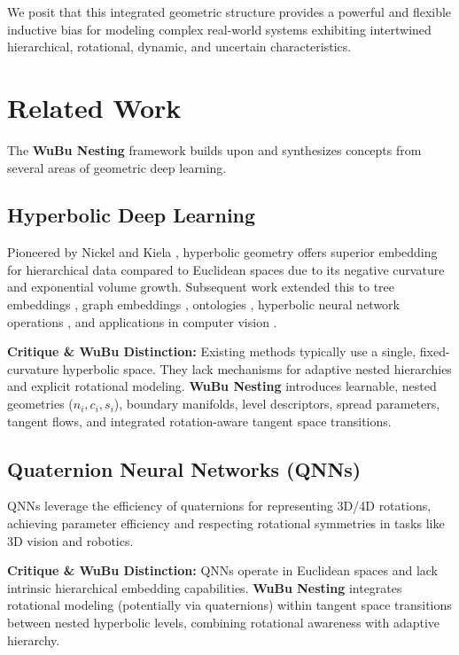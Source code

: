 \documentclass[11pt, twoside]{article} %
\newcommand{\wubu}{\textbf{WuBu Nesting}} %
\begin{document}
We posit that this integrated geometric structure provides a powerful and flexible inductive bias for modeling complex real-world systems exhibiting intertwined hierarchical, rotational, dynamic, and uncertain characteristics.

\section{Related Work}
\label{sec:related_work}

The \wubu{} framework builds upon and synthesizes concepts from several areas of geometric deep learning.

\subsection{Hyperbolic Deep Learning}
\label{subsec:hyperbolic_dl}

Pioneered by Nickel and Kiela \cite{NickelKiela2017}, hyperbolic geometry offers superior embedding for hierarchical data compared to Euclidean spaces due to its negative curvature and exponential volume growth. Subsequent work extended this to tree embeddings \cite{KhrulkovEtAl2020}, graph embeddings \cite{ErmolovEtAl2022, ChamiEtAl2019, ZhangEtAl2021}, ontologies \cite{AtighEtAl2022}, hyperbolic neural network operations \cite{GaneaEtAl2018, GulcehreEtAl2019}, and applications in computer vision \cite{KhrulkovEtAl2020, ErmolovEtAl2022, AtighEtAl2022, LiuHeHan2025}.

\textbf{Critique \& WuBu Distinction:} Existing methods typically use a single, fixed-curvature hyperbolic space. They lack mechanisms for adaptive nested hierarchies and explicit rotational modeling. \wubu{} introduces learnable, nested geometries ($n_i, c_i, s_i$), boundary manifolds, level descriptors, spread parameters, tangent flows, and integrated rotation-aware tangent space transitions.

\subsection{Quaternion Neural Networks (QNNs)}
\label{subsec:qnn}

QNNs \cite{ParcolletEtAl2019, GrassucciEtAl2021} leverage the efficiency of quaternions \cite{Hamilton1866} for representing 3D/4D rotations, achieving parameter efficiency and respecting rotational symmetries in tasks like 3D vision and robotics.

\textbf{Critique \& WuBu Distinction:} QNNs operate in Euclidean spaces and lack intrinsic hierarchical embedding capabilities. \wubu{} integrates rotational modeling (potentially via quaternions) within tangent space transitions between nested hyperbolic levels, combining rotational awareness with adaptive hierarchy.
\end{document}
